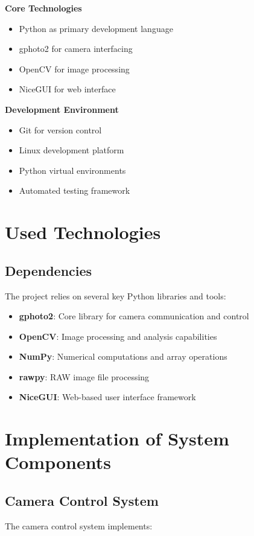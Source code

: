 \textbf{Core Technologies}
\begin{itemize}
    \item Python as primary development language
    \item gphoto2 for camera interfacing
    \item OpenCV for image processing
    \item NiceGUI for web interface
\end{itemize}

\textbf{Development Environment}
\begin{itemize}
    \item Git for version control
    \item Linux development platform
    \item Python virtual environments
    \item Automated testing framework
\end{itemize}

\section{Used Technologies}

\subsection{Dependencies}
The project relies on several key Python libraries and tools:

\begin{itemize}
    \item \textbf{gphoto2}: Core library for camera communication and control
    \item \textbf{OpenCV}: Image processing and analysis capabilities
    \item \textbf{NumPy}: Numerical computations and array operations
    \item \textbf{rawpy}: RAW image file processing
    \item \textbf{NiceGUI}: Web-based user interface framework
\end{itemize}

\section{Implementation of System Components}

\subsection{Camera Control System}
The camera control system implements:

